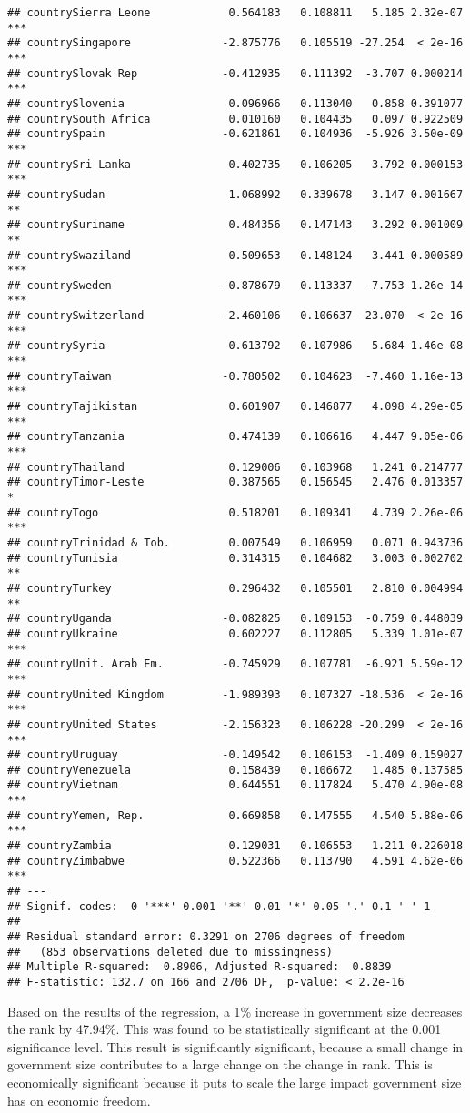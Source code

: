 \documentclass[
  11pt,
]{article}
\begin{document}
\begin{verbatim}
## countrySierra Leone            0.564183   0.108811   5.185 2.32e-07 ***
## countrySingapore              -2.875776   0.105519 -27.254  < 2e-16 ***
## countrySlovak Rep             -0.412935   0.111392  -3.707 0.000214 ***
## countrySlovenia                0.096966   0.113040   0.858 0.391077    
## countrySouth Africa            0.010160   0.104435   0.097 0.922509    
## countrySpain                  -0.621861   0.104936  -5.926 3.50e-09 ***
## countrySri Lanka               0.402735   0.106205   3.792 0.000153 ***
## countrySudan                   1.068992   0.339678   3.147 0.001667 ** 
## countrySuriname                0.484356   0.147143   3.292 0.001009 ** 
## countrySwaziland               0.509653   0.148124   3.441 0.000589 ***
## countrySweden                 -0.878679   0.113337  -7.753 1.26e-14 ***
## countrySwitzerland            -2.460106   0.106637 -23.070  < 2e-16 ***
## countrySyria                   0.613792   0.107986   5.684 1.46e-08 ***
## countryTaiwan                 -0.780502   0.104623  -7.460 1.16e-13 ***
## countryTajikistan              0.601907   0.146877   4.098 4.29e-05 ***
## countryTanzania                0.474139   0.106616   4.447 9.05e-06 ***
## countryThailand                0.129006   0.103968   1.241 0.214777    
## countryTimor-Leste             0.387565   0.156545   2.476 0.013357 *  
## countryTogo                    0.518201   0.109341   4.739 2.26e-06 ***
## countryTrinidad & Tob.         0.007549   0.106959   0.071 0.943736    
## countryTunisia                 0.314315   0.104682   3.003 0.002702 ** 
## countryTurkey                  0.296432   0.105501   2.810 0.004994 ** 
## countryUganda                 -0.082825   0.109153  -0.759 0.448039    
## countryUkraine                 0.602227   0.112805   5.339 1.01e-07 ***
## countryUnit. Arab Em.         -0.745929   0.107781  -6.921 5.59e-12 ***
## countryUnited Kingdom         -1.989393   0.107327 -18.536  < 2e-16 ***
## countryUnited States          -2.156323   0.106228 -20.299  < 2e-16 ***
## countryUruguay                -0.149542   0.106153  -1.409 0.159027    
## countryVenezuela               0.158439   0.106672   1.485 0.137585    
## countryVietnam                 0.644551   0.117824   5.470 4.90e-08 ***
## countryYemen, Rep.             0.669858   0.147555   4.540 5.88e-06 ***
## countryZambia                  0.129031   0.106553   1.211 0.226018    
## countryZimbabwe                0.522366   0.113790   4.591 4.62e-06 ***
## ---
## Signif. codes:  0 '***' 0.001 '**' 0.01 '*' 0.05 '.' 0.1 ' ' 1
## 
## Residual standard error: 0.3291 on 2706 degrees of freedom
##   (853 observations deleted due to missingness)
## Multiple R-squared:  0.8906, Adjusted R-squared:  0.8839 
## F-statistic: 132.7 on 166 and 2706 DF,  p-value: < 2.2e-16
\end{verbatim}

Based on the results of the regression, a 1\% increase in government
size decreases the rank by 47.94\%. This was found to be statistically
significant at the 0.001 significance level. This result is
significantly significant, because a small change in government size
contributes to a large change on the change in rank. This is
economically significant because it puts to scale the large impact
government size has on economic freedom.
\end{document}
